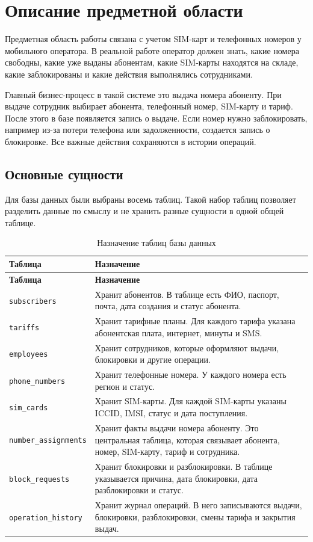 \chapter{Описание предметной области}

Предметная область работы связана с учетом SIM-карт и телефонных номеров у мобильного оператора. В реальной работе оператор должен знать, какие номера свободны, какие уже выданы абонентам, какие SIM-карты находятся на складе, какие заблокированы и какие действия выполнялись сотрудниками.

Главный бизнес-процесс в такой системе это выдача номера абоненту. При выдаче сотрудник выбирает абонента, телефонный номер, SIM-карту и тариф. После этого в базе появляется запись о выдаче. Если номер нужно заблокировать, например из-за потери телефона или задолженности, создается запись о блокировке. Все важные действия сохраняются в истории операций.

\section{Основные сущности}

Для базы данных были выбраны восемь таблиц. Такой набор таблиц позволяет разделить данные по смыслу и не хранить разные сущности в одной общей таблице.

\begin{longtable}{|p{}|p{}|}
\caption{Назначение таблиц базы данных} \\
\hline
\textbf{Таблица} & \textbf{Назначение} \\
\hline
\endfirsthead
\hline
\textbf{Таблица} & \textbf{Назначение} \\
\hline
\endhead
\texttt{subscribers} & Хранит абонентов. В таблице есть ФИО, паспорт, почта, дата создания и статус абонента. \\
\hline
\texttt{tariffs} & Хранит тарифные планы. Для каждого тарифа указана абонентская плата, интернет, минуты и SMS. \\
\hline
\texttt{employees} & Хранит сотрудников, которые оформляют выдачи, блокировки и другие операции. \\
\hline
\texttt{phone\_numbers} & Хранит телефонные номера. У каждого номера есть регион и статус. \\
\hline
\texttt{sim\_cards} & Хранит SIM-карты. Для каждой SIM-карты указаны ICCID, IMSI, статус и дата поступления. \\
\hline
\texttt{number\_assignments} & Хранит факты выдачи номера абоненту. Это центральная таблица, которая связывает абонента, номер, SIM-карту, тариф и сотрудника. \\
\hline
\texttt{block\_requests} & Хранит блокировки и разблокировки. В таблице указывается причина, дата блокировки, дата разблокировки и статус. \\
\hline
\texttt{operation\_history} & Хранит журнал операций. В него записываются выдачи, блокировки, разблокировки, смены тарифа и закрытия выдач. \\
\hline
\end{longtable}

